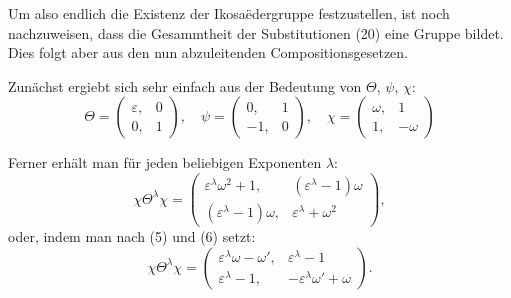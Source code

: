 Um also endlich die Existenz der Ikosa\"edergruppe festzustellen, ist noch nachzuweisen, dass die Gesammtheit der Substitutionen (20) eine Gruppe bildet. Dies folgt aber aus den nun abzuleitenden Compositionsgesetzen.

Zunächst ergiebt sich sehr einfach aus der Bedeutung von $\Theta$, $\psi$, $\chi$:
\[
\Theta = \begin{pmatrix} \varepsilon, & 0 \\ 0, & 1 \end{pmatrix}, \quad
\psi = \begin{pmatrix} 0, & 1 \\ -1, & 0 \end{pmatrix}, \quad
\chi = \begin{pmatrix} \omega, & 1 \\ 1, & -\omega \end{pmatrix}
\]

Ferner erhält man für jeden beliebigen Exponenten $\lambda$:
\[
\chi\Theta^\lambda\chi = \begin{pmatrix} \varepsilon^\lambda\omega^2+1, & (\varepsilon^\lambda-1)\omega \\ (\varepsilon^\lambda-1)\omega, & \varepsilon^\lambda+\omega^2 \end{pmatrix},
\]
oder, indem man nach (5) und (6)
setzt:
\[
\chi\Theta^\lambda\chi = \begin{pmatrix} \varepsilon^\lambda\omega-\omega', & \varepsilon^\lambda-1 \\ \varepsilon^\lambda-1, & -\varepsilon^\lambda\omega'+\omega \end{pmatrix}.
\]

